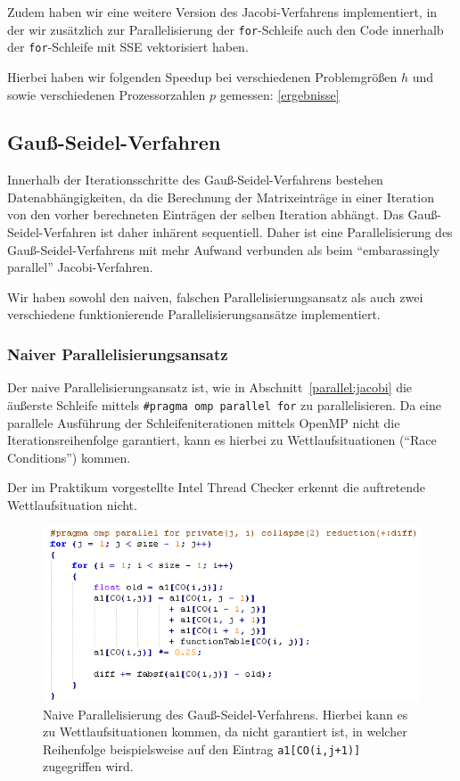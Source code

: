\documentclass{article}
\begin{document}
Zudem haben wir eine weitere Version des Jacobi-Verfahrens implementiert, in der wir zusätzlich zur Parallelisierung der \texttt{for}-Schleife auch den Code innerhalb der \texttt{for}-Schleife mit SSE vektorisiert haben.

Hierbei haben wir folgenden Speedup bei verschiedenen Problemgrößen $h$ und sowie verschiedenen Prozessorzahlen $p$ gemessen: \ref{ergebnisse}

\subsection{Gauß-Seidel-Verfahren}

Innerhalb der Iterationsschritte des Gauß-Seidel-Verfahrens bestehen Datenabhängigkeiten, da die Berechnung der Matrixeinträge in einer Iteration von den vorher berechneten Einträgen der selben Iteration abhängt. Das Gauß-Seidel-Verfahren ist daher inhärent sequentiell. Daher ist eine Parallelisierung des Gauß-Seidel-Verfahrens mit mehr Aufwand verbunden als beim ``embarassingly parallel'' Jacobi-Verfahren.

Wir haben sowohl den naiven, falschen Parallelisierungsansatz als auch zwei verschiedene funktionierende Parallelisierungsansätze implementiert.

\subsubsection{Naiver Parallelisierungsansatz}\label{gs:naiv}
Der naive Parallelisierungsansatz ist, wie in Abschnitt~\ref{parallel:jacobi} die äußerste Schleife mittels \texttt{\#pragma omp parallel for} zu parallelisieren. Da eine parallele Ausführung der Schleifeniterationen mittels OpenMP nicht die Iterationsreihenfolge garantiert, kann es hierbei zu Wettlaufsituationen (``Race Conditions'') kommen.

Der im Praktikum vorgestellte Intel Thread Checker erkennt die auftretende Wettlaufsituation nicht.

\begin{figure}[h] 
  \centering
     \includegraphics[width=1.0\textwidth]{bilder/race.png}
  \caption{Naive Parallelisierung des Gauß-Seidel-Verfahrens. Hierbei kann es zu Wettlaufsituationen kommen, da nicht garantiert ist, in welcher Reihenfolge beispielsweise auf den Eintrag  \texttt{a1[CO(i,j+1)]} zugegriffen wird.}
\end{figure}
\end{document}
